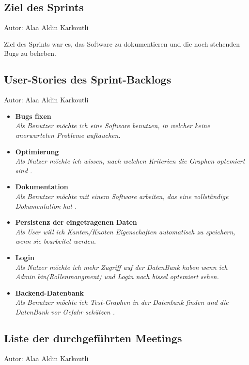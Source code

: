 \subsection{Ziel des Sprints}
{\small Autor: Alaa Aldin Karkoutli}

Ziel des Sprints war es, das Software zu dokumentieren und die noch stehenden Bugs zu beheben.\\

\subsection{User-Stories des Sprint-Backlogs}
{\small Autor: Alaa Aldin Karkoutli}

\begin{itemize}
  \item \textbf{Bugs fixen}
        \\\textit{Als Benutzer möchte ich eine Software benutzen, in welcher keine unerwarteten Probleme auftauchen.}
  \item \textbf{ Optimierung }
        \\\textit{
        Als Nutzer möchte ich wissen, nach welchen Kriterien die Graphen optemiert sind .}
  \item \textbf{Dokumentation }
        \\\textit{
          Als Benutzer möchte mit einem Software arbeiten, das eine vollständige Dokumentation hat .}
  \item \textbf{Persistenz der eingetragenen Daten}
        \\\textit{
          Als User will ich Kanten/Knoten Eigenschaften automatisch zu speichern, wenn sie bearbeitet werden.}
  \item \textbf{Login}
        \\\textit{
          Als Nutzer möchte ich mehr Zugriff auf der DatenBank haben wenn ich Admin bin(Rollenmangment) und Login noch bissel optemiert sehen.}
  \item \textbf{Backend-Datenbank}
        \\\textit{
          Als Benutzer möchte ich Test-Graphen in der Datenbank finden und die DatenBank vor Gefahr schützen .}
\end{itemize}

\subsection{Liste der durchgeführten Meetings}
{\small Autor: Alaa Aldin Karkoutli}

